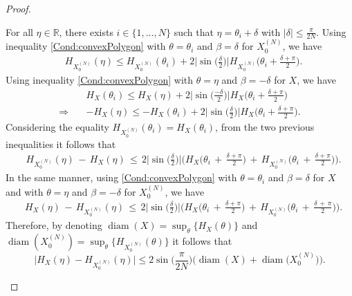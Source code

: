\documentclass[numbers,compress,v1.0.1]{vmsta}
\theoremstyle{definition}
\begin{document}
\begin{proof}
\begin{enumerate}
For all $\eta\in\mathbb{R}$, there exists $i\in\lbrace1,\dots,N\rbrace$
such that $\eta=\theta_i+\delta$ with $\vert\delta\vert\leq\frac{\pi}{2N}$. Using inequality \eqref{Cond:convexPolygon} with $\theta
=\theta_i$ and $\beta=\delta$ for $X_0^{(N)}$, we have
%
\begin{align*}
& H_{X_0^{(N)}}(\eta)\leq H_{X_0^{(N)}}(\theta_i)+2\biggl\vert\sin
\biggl(\frac
{\delta}{2}\biggr)\biggr\vert H_{X_0^{(N)}}\biggl(\theta_i+
\frac{\delta+\pi}{2}\biggr).
\end{align*}
%
Using inequality \eqref{Cond:convexPolygon} with $\theta=\eta$ and
$\beta=-\delta$ for $X$, we have
%
\begin{align*}
& H_{X}(\theta_i)\leq H_{X}(\eta)+2\biggl\vert\sin
\biggl(\frac{-\delta}{2}\biggr)\biggr\vert H_{X}\biggl(\theta_i+
\frac{\delta+\pi}{2}\biggr)
\\
\Rightarrow \quad &-H_{X}(\eta)\leq -H_{X}(\theta_i)
+2\biggl\vert\sin\biggl(\frac
{\delta}{2}\biggr)\biggr\vert H_{X}\biggl(
\theta_i+\frac{\delta+\pi}{2}\biggr).
\end{align*}
%
Considering the equality $ H_{X_0^{(N)}}(\theta_i)= H_{X}(\theta_i) $,
from the two previous inequalities it follows that
%
\begin{align*}
&H_{X_0^{(N)}}(\eta)\,{-}\,H_{X}(\eta)\,{\leq}\,2\biggl\vert\sin\biggl(
\frac{\delta}{2}\biggr)\biggr\vert \biggl( H_{X}\biggl(
\theta_i\,{+}\,\frac{\delta+\pi}{2}\biggr)\,{+}\, H_{X_0^{(N)}}\biggl(
\theta_i\,{+}\,\frac
{\delta+\pi}{2}\biggr)\biggr).
\end{align*}
%
In the same manner, using \eqref{Cond:convexPolygon} with $\theta=\theta
_i$ and $\beta=\delta$ for $X$ and with $\theta=\eta$ and $\beta=-\delta
$ for $X_0^{(N)}$, we have
%
\begin{align*}
&H_{X}(\eta) \,{-}\,H_{X_0^{(N)}}(\eta)\,{\leq}\,2\biggl\vert\sin\biggl(
\frac{\delta}{2}\biggr)\biggr\vert \biggl( H_{X}\biggl(
\theta_i\,{+}\,\frac{\delta+\pi}{2}\biggr)\,{+}\, H_{X_0^{(N)}}\biggl(
\theta_i\,{+}\,\frac
{\delta\,{+}\,\pi}{2}\biggr)\biggr).
\end{align*}
%
Therefore, by denoting $\operatorname{diam}(X)=\sup_\theta\lbrace H_X(\theta)\rbrace$
and $\operatorname{diam}(X_0^{(N)})=\sup_\theta\lbrace H_{X_0^{(N)}}(\theta)\rbrace$
it follows that
%
\begin{equation}
\bigl\vert H_{X}(\eta) -H_{X_0^{(N)}}(\eta)\bigr\vert\leq2\sin\biggl(
\frac{\pi}{2N}\biggr) \bigl( \operatorname{diam}(X)+\operatorname{diam}\bigl(X_0^{(N)}
\bigr)\bigr). \label{eq:major1}
\end{equation}

\end{enumerate}
\end{proof}
\end{document}
